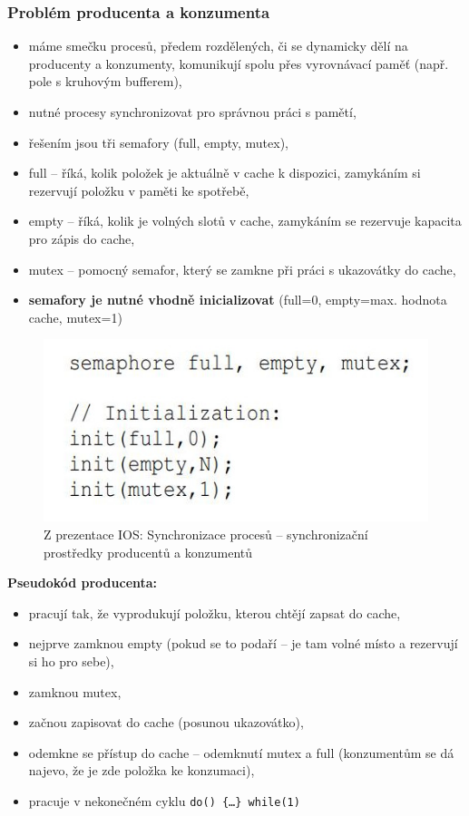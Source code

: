 \documentclass[a4paper, 11pt]{article}
\newcommand{\tcmd}[1]{\texttt{#1}}
\begin{document}
\subsubsection{Problém producenta a konzumenta}
\begin{itemize}
    \item máme smečku procesů, předem rozdělených, či se dynamicky dělí na producenty a konzumenty, komunikují spolu přes vyrovnávací paměť (např. pole s kruhovým bufferem),
    \item nutné procesy synchronizovat pro správnou práci s pamětí,
    \item řešením jsou tři semafory (full, empty, mutex),
    \item full -- říká, kolik položek je aktuálně v cache k dispozici, zamykáním si rezervují položku v paměti ke spotřebě,
    \item empty -- říká, kolik je volných slotů v cache, zamykáním se rezervuje kapacita pro zápis do cache,
    \item mutex -- pomocný semafor, který se zamkne při práci s ukazovátky do cache,
    \item \textbf{semafory je nutné vhodně inicializovat} (full=0, empty=max. hodnota cache, mutex=1)
\end{itemize}

\begin{figure}[ht]
    \centering
    \includegraphics[scale=2]{11.2.1_1.jpg}
    \caption{Z prezentace IOS: Synchronizace procesů -- synchronizační prostředky producentů a konzumentů}
\end{figure}

\textbf{Pseudokód producenta:}
\begin{itemize}
    \item pracují tak, že vyprodukují položku, kterou chtějí zapsat do cache,
    \item nejprve zamknou empty (pokud se to podaří -- je tam volné místo a rezervují si ho pro sebe),
    \item zamknou mutex,
    \item začnou zapisovat do cache (posunou ukazovátko),
    \item odemkne se přístup do cache -- odemknutí mutex a full (konzumentům se dá najevo, že je zde položka ke konzumaci),
    \item pracuje v nekonečném cyklu \tcmd{do() \{\ldots\} while(1)}
\end{itemize}
 
\end{document}
